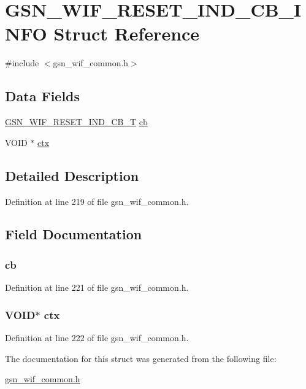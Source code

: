 \hypertarget{a00344}{
\section{GSN\_\-WIF\_\-RESET\_\-IND\_\-CB\_\-INFO Struct Reference}
\label{a00344}
}


{\ttfamily \#include $<$gsn\_\-wif\_\-common.h$>$}

\subsection*{Data Fields}
\begin{DoxyCompactItemize}
\item 
\hyperlink{a00635_gad71afa8e03b517ec379abfa3cb39de92}{GSN\_\-WIF\_\-RESET\_\-IND\_\-CB\_\-T} \hyperlink{a00344_a7dfda01a3ae8f5d4288bb1f8f80c172e}{cb}
\item 
VOID $\ast$ \hyperlink{a00344_add401254b29adaa41706c97d1c8d3e89}{ctx}
\end{DoxyCompactItemize}


\subsection{Detailed Description}


Definition at line 219 of file gsn\_\-wif\_\-common.h.



\subsection{Field Documentation}
\hypertarget{a00344_a7dfda01a3ae8f5d4288bb1f8f80c172e}{
\subsubsection[{cb}]{ {\bf cb}}}
\label{a00344_a7dfda01a3ae8f5d4288bb1f8f80c172e}


Definition at line 221 of file gsn\_\-wif\_\-common.h.

\hypertarget{a00344_add401254b29adaa41706c97d1c8d3e89}{
\subsubsection[{ctx}]{\setlength{\rightskip}{0pt plus 5cm}VOID$\ast$ {\bf ctx}}}
\label{a00344_add401254b29adaa41706c97d1c8d3e89}


Definition at line 222 of file gsn\_\-wif\_\-common.h.



The documentation for this struct was generated from the following file:\begin{DoxyCompactItemize}
\item 
\hyperlink{a00608}{gsn\_\-wif\_\-common.h}\end{DoxyCompactItemize}
